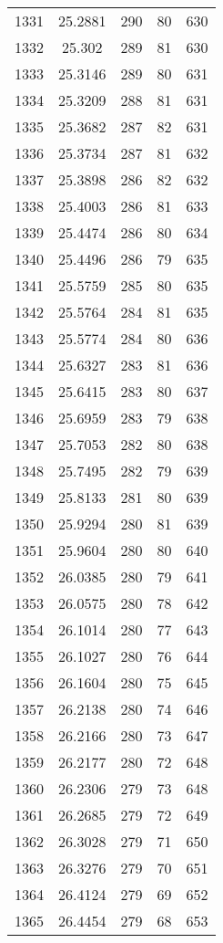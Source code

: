 \documentclass[12pt,a4paper]{article}
\begin{document}
\begin{tabular}{r|cccc}
	1331 & 25.2881 & 290 & 80 & 630 \\
	1332 & 25.302 & 289 & 81 & 630 \\
	1333 & 25.3146 & 289 & 80 & 631 \\
	1334 & 25.3209 & 288 & 81 & 631 \\
	1335 & 25.3682 & 287 & 82 & 631 \\
	1336 & 25.3734 & 287 & 81 & 632 \\
	1337 & 25.3898 & 286 & 82 & 632 \\
	1338 & 25.4003 & 286 & 81 & 633 \\
	1339 & 25.4474 & 286 & 80 & 634 \\
	1340 & 25.4496 & 286 & 79 & 635 \\
	1341 & 25.5759 & 285 & 80 & 635 \\
	1342 & 25.5764 & 284 & 81 & 635 \\
	1343 & 25.5774 & 284 & 80 & 636 \\
	1344 & 25.6327 & 283 & 81 & 636 \\
	1345 & 25.6415 & 283 & 80 & 637 \\
	1346 & 25.6959 & 283 & 79 & 638 \\
	1347 & 25.7053 & 282 & 80 & 638 \\
	1348 & 25.7495 & 282 & 79 & 639 \\
	1349 & 25.8133 & 281 & 80 & 639 \\
	1350 & 25.9294 & 280 & 81 & 639 \\
	1351 & 25.9604 & 280 & 80 & 640 \\
	1352 & 26.0385 & 280 & 79 & 641 \\
	1353 & 26.0575 & 280 & 78 & 642 \\
	1354 & 26.1014 & 280 & 77 & 643 \\
	1355 & 26.1027 & 280 & 76 & 644 \\
	1356 & 26.1604 & 280 & 75 & 645 \\
	1357 & 26.2138 & 280 & 74 & 646 \\
	1358 & 26.2166 & 280 & 73 & 647 \\
	1359 & 26.2177 & 280 & 72 & 648 \\
	1360 & 26.2306 & 279 & 73 & 648 \\
	1361 & 26.2685 & 279 & 72 & 649 \\
	1362 & 26.3028 & 279 & 71 & 650 \\
	1363 & 26.3276 & 279 & 70 & 651 \\
	1364 & 26.4124 & 279 & 69 & 652 \\
	1365 & 26.4454 & 279 & 68 & 653 \\

\end{tabular}
\end{document}

